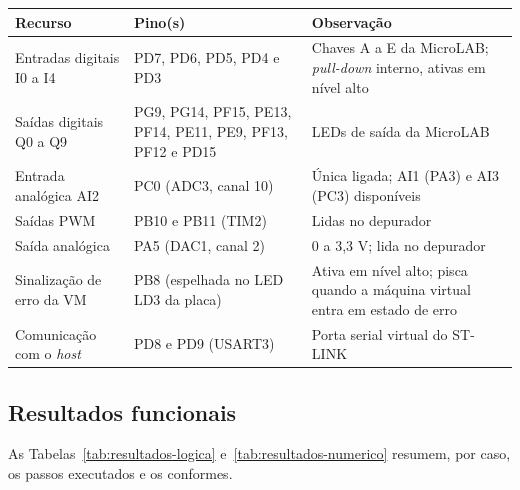 \begin{quadrofixo}
    \centering
    \small
    \begin{tabular}{|p{4.4cm}|p{4.6cm}|p{5.2cm}|}
        \hline
        Recurso & Pino(s) & Observação \\
        \hline
        Entradas digitais I0 a I4 & PD7, PD6, PD5, PD4 e PD3 & Chaves A a E da MicroLAB; \textit{pull-down} interno, ativas em nível alto \\
        \hline
        Saídas digitais Q0 a Q9 & PG9, PG14, PF15, PE13, PF14, PE11, PE9, PF13, PF12 e PD15 & LEDs de saída da MicroLAB \\
        \hline
        Entrada analógica AI2 & PC0 (ADC3, canal 10) & Única ligada; AI1 (PA3) e AI3 (PC3) disponíveis \\
        \hline
        Saídas PWM & PB10 e PB11 (TIM2) & Lidas no depurador \\
        \hline
        Saída analógica & PA5 (DAC1, canal 2) & 0 a 3,3 V; lida no depurador \\
        \hline
        Sinalização de erro da VM & PB8 (espelhada no LED LD3 da placa) & Ativa em nível alto; pisca quando a máquina virtual entra em estado de erro \\
        \hline
        Comunicação com o \textit{host} & PD8 e PD9 (USART3) & Porta serial virtual do ST-LINK \\
        \hline
    \end{tabular}

    \label{qua:pinagem}
\end{quadrofixo}

\subsection{Resultados funcionais}
\label{sub:resultados-funcionais}

As Tabelas~\ref{tab:resultados-logica} e~\ref{tab:resultados-numerico} resumem, por caso, os passos executados e os conformes.

